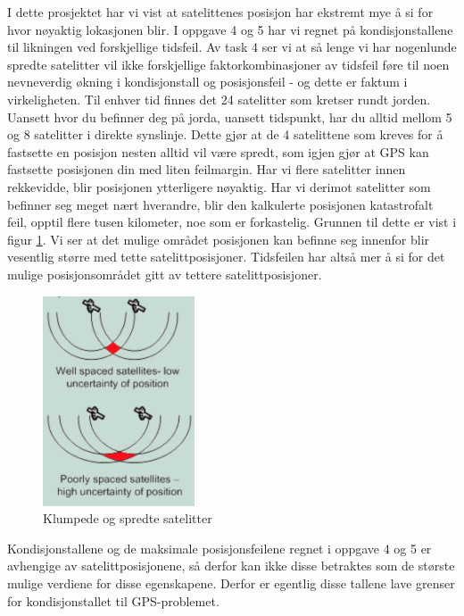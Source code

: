I dette prosjektet har vi vist at satelittenes posisjon har ekstremt mye å si for hvor nøyaktig lokasjonen blir. I oppgave 4 og 5 har vi regnet på kondisjonstallene til likningen ved forskjellige tidsfeil. Av task 4 ser vi at så lenge vi har nogenlunde spredte satelitter vil ikke forskjellige faktorkombinasjoner av tidsfeil føre til noen nevneverdig økning i kondisjonstall og posisjonsfeil - og dette er faktum i virkeligheten. Til enhver tid finnes det 24 satelitter som kretser rundt jorden. Uansett hvor du befinner deg på jorda, uansett tidspunkt, har du alltid mellom 5 og 8 satelitter i direkte synslinje. Dette gjør at de 4 satelittene som kreves for å fastsette en posisjon nesten alltid vil være spredt, som igjen gjør at GPS kan fastsette posisjonen din med liten feilmargin. Har vi flere satelitter innen rekkevidde, blir posisjonen ytterligere nøyaktig. Har vi derimot satelitter som befinner seg meget nært hverandre, blir den kalkulerte posisjonen katastrofalt feil, opptil flere tusen kilometer, noe som er forkastelig. Grunnen til dette er vist i figur \ref{fig:bunchedsat}. Vi ser at det mulige området posisjonen kan befinne seg innenfor blir vesentlig større med tette satelittposisjoner. Tidsfeilen har altså mer å si for det mulige posisjonsområdet gitt av tettere satelittposisjoner.

\begin{figure}[htbp]
	\centering
	\includegraphics[width=0.4\textwidth]{sections/Conclusion/bunchedsat.png}
	\caption{Klumpede og spredte satelitter}
	\label{fig:bunchedsat}
\end{figure}

Kondisjonstallene og de maksimale posisjonsfeilene regnet i oppgave 4 og 5 er avhengige av satelittposisjonene, så derfor kan ikke disse betraktes som de største mulige verdiene for disse egenskapene. Derfor er egentlig disse tallene lave grenser for kondisjonstallet til GPS-problemet. 

